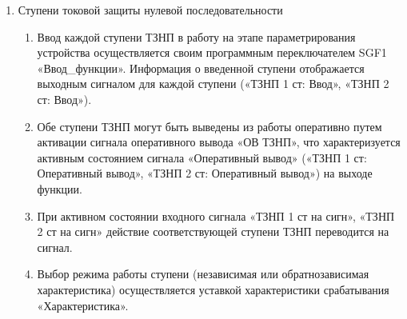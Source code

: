 \begin{enumerate}
\begin{enumerate}
\item
В составе функционального блока «ТЗНП» предусмотрены следующие функции:
\begin{itemize}
\item две независимые направленные/ненаправленные ступени -- функции «ТЗНП 1 ст.», «ТЗНП 2 ст.»;
\item блокировка при броске намагничивающего тока -- функция «БНТ»;
\item орган направления мощности нулевой последовательности -- функция «ОНМ НП».
\end{itemize}

\item
Функциональный блок «ТЗНП» может быть полностью выведен из работы оперативно путем активации сигнала «ОВ ТЗНП».

\item
В таблице \ref{tznp:tbl1} приведены параметры, необходимые для настройки ТЗНП.

\end{enumerate}


\item Ступени токовой защиты нулевой последовательности

\begin{enumerate}

\item
Ввод каждой ступени ТЗНП в работу на этапе параметрирования устройства осуществляется своим программным переключателем SGF1 «Ввод\_функции». Информация о введенной ступени отображается выходным сигналом для каждой ступени («ТЗНП 1 ст: Ввод», «ТЗНП 2 ст: Ввод»).

\item
Обе ступени ТЗНП могут быть выведены из работы оперативно путем активации сигнала оперативного вывода «ОВ ТЗНП», что характеризуется активным состоянием сигнала «Оперативный вывод» («ТЗНП 1 ст: Оперативный вывод», «ТЗНП 2 ст: Оперативный вывод») на выходе функции.

\item
При активном состоянии входного сигнала «ТЗНП 1 ст на сигн», «ТЗНП 2 ст на сигн» действие соответствующей ступени ТЗНП переводится на сигнал.

\item
Выбор режима работы ступени (независимая или обратнозависимая характеристика) осуществляется уставкой характеристики срабатывания «Характеристика».


\end{enumerate}
\end{enumerate}
